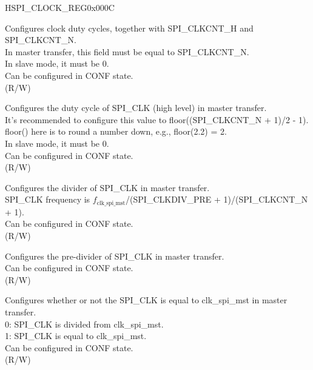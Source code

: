 \begin{register}{H}{SPI\_CLOCK\_REG}{0x000C}\label{regdesc:SPICLOCKREG}
%
%
%
%
%
%
\regnewline%
\begin{regdesc}\begin{reglist}
\label{fielddesc:SPICLKCNTL}\item [SPI\_CLKCNT\_L] Configures clock duty cycles, together with SPI\_CLKCNT\_H and SPI\_CLKCNT\_N.\\
In master transfer, this field must be equal to SPI\_CLKCNT\_N. \\
In slave mode, it must be 0. \\
Can be configured in CONF state.\\
(R/W)
\label{fielddesc:SPICLKCNTH}\item [SPI\_CLKCNT\_H] Configures the duty cycle of SPI\_CLK (high level) in master transfer.\\
It's recommended to configure this value to floor((SPI\_CLKCNT\_N + 1)/2 - 1). floor() here is to round a number down, e.g., floor(2.2) = 2. \\
In slave mode, it must be 0. \\
Can be configured in CONF state.\\
(R/W)
\label{fielddesc:SPICLKCNTN}\item [SPI\_CLKCNT\_N] Configures the divider of SPI\_CLK in master transfer.\\
SPI\_CLK frequency is $f_{\textrm{clk\_spi\_mst}}$/(SPI\_CLKDIV\_PRE + 1)/(SPI\_CLKCNT\_N + 1). \\
Can be configured in CONF state. \\
(R/W)
\label{fielddesc:SPICLKDIVPRE}\item [SPI\_CLKDIV\_PRE] Configures the pre-divider of SPI\_CLK in master transfer.\\
Can be configured in CONF state. \\
(R/W)
\label{fielddesc:SPICLKEQUSYSCLK}\item [SPI\_CLK\_EQU\_SYSCLK] Configures whether or not the SPI\_CLK is equal to clk\_spi\_mst in master transfer.\\
0: SPI\_CLK is divided from clk\_spi\_mst.\\
1: SPI\_CLK is equal to clk\_spi\_mst.\\
Can be configured in CONF state. \\
(R/W)
\end{reglist}\end{regdesc}
\end{register}



